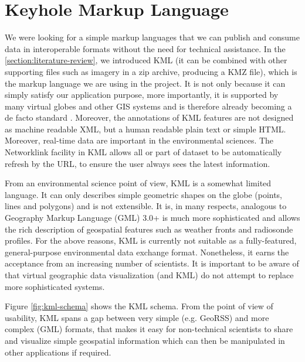 \section{Keyhole Markup Language}

We were looking for a simple markup languages that we can publish and consume data  in interoperable formats without the need for technical assistance. In the \ref{section:literature-review}, we introduced KML (it can be combined with other supporting files such as imagery in a zip archive, producing a KMZ file), which is the markup language we are using in the project. It is not only because it can simply satisfy our application purpose, more importantly, it is supported by many virtual globes and other GIS systems and is therefore already becoming a de facto standard \parencite{blower.sharing-visualizing.2007}. Moreover, the annotations of KML features are not designed as machine readable XML, but a human readable plain text or simple HTML. Moreover, real-time data are important in the environmental sciences. The Networklink facility in KML allows all or part of dataset to be automatically refresh by the URL, to ensure the user always sees the latest information.

From an environmental science point of view, KML is a somewhat limited language. It  can only describes simple geometric shapes on the globe (points, lines and polygons) and is not extensible. It is, in many respects, analogous to Geography Markup Language (GML) 3.0+ is much more sophisticated and allows the rich description of geospatial features such as weather fronts and radiosonde profiles. For the above reasons, KML is currently not suitable as a fully-featured, general-purpose environmental data exchange format. Nonetheless, it earns the acceptance from an increasing number of scientists. It is important to be aware of that virtual geographic data visualization (and KML) do not attempt to replace more sophisticated systems. 

Figure \ref{fig:kml-schema} shows the KML schema. From the point of view of usability, KML spans a gap between very simple (e.g. GeoRSS) and more complex (GML) formats, that makes it easy for non-technical scientists to share and visualize simple geospatial information which can then be manipulated in other applications if required. 

